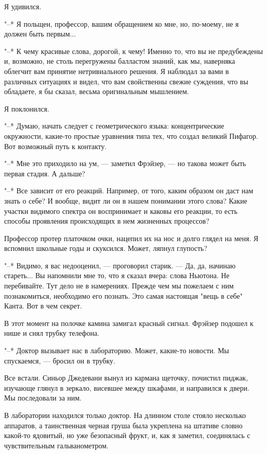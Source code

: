 Я удивился.

"--* Я польщен, профессор, вашим обращением ко мне,  но,  по-моему,  не  я
должен быть первым...

"--* К чему красивые  слова,  дорогой,  к  чему!  Именно  то,  что  вы  не
предубеждены и, возможно, не столь перегружены балластом знаний,  как  мы,
наверняка облегчит вам принятие нетривиального решения. Я наблюдал за вами
в различных ситуациях и видел, что вам свойственны свежие суждения, что вы
обладаете, я бы сказал, весьма оригинальным мышлением.

Я поклонился.

"--*  Думаю,  начать  следует  с  геометрического  языка:  концентрические
окружности, какие-то  простые  уравнения  типа  тех,  что  создал  великий
Пифагор. Вот возможный путь к контакту.

"--* Мне это приходило на ум, --- заметил Фрэйзер, --- но  такова  может  быть
первая стадия. А дальше?

"--* Все зависит от его реакций. Например, от того, каким образом он  даст
нам знать о себе? И вообще, видит ли он в  нашем  понимании  этого  слова?
Какие участки видимого спектра он воспринимает и каковы  его  реакции,  то
есть способы проявления происходящих в нем жизненных процессов?

Профессор протер платочком очки, нацепил их на нос и  долго  глядел  на
меня. Я вспомнил школьные годы и скуксился. Может, ляпнул глупость?

"--* Видимо, я вас недооценил, --- проговорил  старик.  ---  Да,  да,  начинаю
стареть... Вы напомнили мне то, что я  сказал  вчера:  слова  Ньютона.  Не
перебивайте. Тут дело не в  намерениях.  Прежде  чем  мы  пожелаем  с  ним
познакомиться, необходимо его познать. Это самая настоящая "вещь  в  себе"
Канта. Вот в чем секрет.

В этот момент на полочке камина замигал красный сигнал. Фрэйзер подошел
к нише и снял трубку телефона.

"--* Доктор вызывает  нас  в  лабораторию.  Может,  какие-то  новости.  Мы
спускаемся, --- бросил он в трубку.

Все встали. Синьор Джедевани вынул из кармана щеточку, почистил пиджак,
изучающе глянул в зеркало, висевшее между шкафами, и направился  к  двери.
Мы последовали за ним.

В  лаборатории  находился  только  доктор.  На  длинном  столе   стояло
несколько аппаратов, а таинственная черная груша была укреплена на штативе
словно какой-то ядовитый, но уже  безопасный  фрукт,  и,  как  я  заметил,
соединялась с чувствительным гальванометром.

